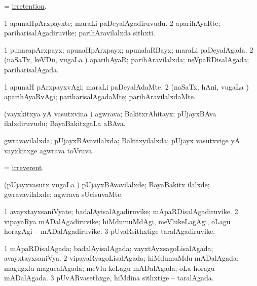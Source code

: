 \bentry
{}
\gl{\nA}
\bmng
=  \hyperlink{irretention}{irretention}. 
\emng
\eentry

\bentry
{}
\gl{\nA}
\bmng
\bnum
\num{1} apunaHpArxpayxte; maraLi paDeyalAgadiruvudu. 
\num{2} aparihAyaRte; pariharisalAgadiruvike; parihAravilalxda sithxti. 
\enum
\emng
\eentry

\bentry
{}
\gl{\gu}
\bmng
\bnum
\num{1} punarapArxpayx; apunaHpArxpayx; apunalaRBayx; maraLi paDeyalAgada. 
\num{2} (naSaTx, keVDu, \mo vugaLa \vi) aparihAyaR; parihAravilalxda; neVpaRDisalAgada; pariharisalAgada. 
\enum
\emng
\eentry

\bentry
{}
\gl{\kirxvi}
\bmng
\bnum
\num{1} apunaH pArxpayxvAgi; maraLi paDeyalAdaMte. 
\num{2} (naSaTx, hAni, \mo vugaLa \vi) aparihAyaRvAgi; pariharisalAgadaMte; parihAravilalxdaMte. 
\enum
\emng
\eentry

\bentry
{}
\gl{\nA}
\bmng
(vayxkitxya yA vasutxvina \vi) agwrava; BakitxrAhitayx; pUjayxBAva ilalxdiruvudu; BayaBakitxgaLa aBAva. 
\emng
\eentry

\bentry
{}
\gl{\gu}
\bmng
gwravavilalxda; pUjayxBAvavilalxda; Bakitxyilalxda; pUjayx vasutxvige yA vayxkitxge agwrava toVruva. 
\emng
\eentry

\bentry
{}
\gl{\gu}
\bmng
=  \hyperlink{irreverent}{irreverent}. 
\emng
\eentry

\bentry
{}
\gl{\kirxvi}
\bmng
(pUjayxvasutx \mo vugaLa \vi) pUjayxBAvavilalxde; BayaBakitx ilalxde; gwravavilalxde; agwrava sUcisuvaMte. 
\emng
\eentry

\bentry
{}
\gl{\nA}
\bmng
\bnum
\num{1} avayxtayxsaniVyate; badalAyisalAgadiruvike; mApaRDisalAgadiruvike. 
\num{2} vipayaRya mADalAgadiruvike; hiMdumuMdAgi, meVlukeLagAgi, oLagu horagAgi -- mADalAgadiruvike. 
\num{3} pUvaRsithxtige taralAgadiruvike. 
\enum
\emng
\eentry

\bentry
{}
\gl{\gu}
\bmng
\bnum
\num{1} mApaRDisalAgada; badalAyisalAgada; vayxtAyxsagoLisalAgada; avayxtayxsaniVya. 
\num{2} vipayaRyagoLisalAgada; hiMdumuMdu mADalAgada; magugxlu magucalAgada; meVlu keLagu mADalAgada; oLa horagu mADalAgada. 
\num{3} pUvARvasethxge, hiMdina sithxtige -- taralAgada. 
\enum
\emng
\eentry

